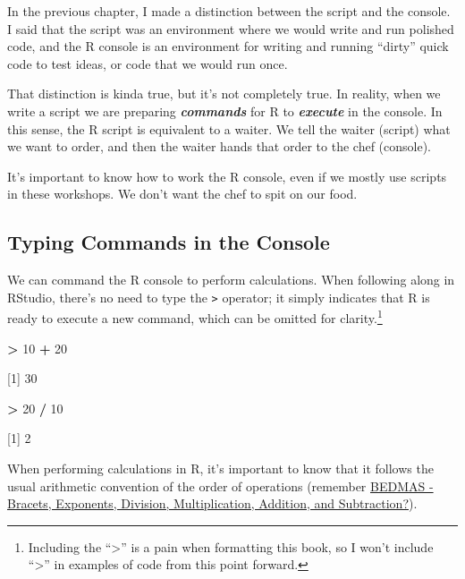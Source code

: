 \documentclass[
]{book}
\newenvironment{Shaded}{\begin{snugshade}}{\end{snugshade}}
\newcommand{\DecValTok}[1]{\textcolor[rgb]{0.00,0.00,0.81}{#1}}
\newcommand{\NormalTok}[1]{#1}
\newcommand{\SpecialCharTok}[1]{\textcolor[rgb]{0.81,0.36,0.00}{\textbf{#1}}}
\begin{document}
In the previous chapter, I made a distinction between the script and the console. I said that the script was an environment where we would write and run polished code, and the R console is an environment for writing and running ``dirty'' quick code to test ideas, or code that we would run once.

That distinction is kinda true, but it's not completely true. In reality, when we write a script we are preparing \textbf{\emph{commands}} for R to \textbf{\emph{execute}} in the console. In this sense, the R script is equivalent to a waiter. We tell the waiter (script) what we want to order, and then the waiter hands that order to the chef (console).

It's important to know how to work the R console, even if we mostly use scripts in these workshops. We don't want the chef to spit on our food.

\hypertarget{typing-commands-in-the-console}{%
\subsection{Typing Commands in the Console}\label{typing-commands-in-the-console}}

We can command the R console to perform calculations. When following along in RStudio, there's no need to type the \texttt{\textgreater{}} operator; it simply indicates that R is ready to execute a new command, which can be omitted for clarity.\footnote{Including the ``\textgreater{}'' is a pain when formatting this book, so I won't include ``\textgreater{}'' in examples of code from this point forward.}

\begin{Shaded}
\begin{Highlighting}[]
\SpecialCharTok{\textgreater{}} \DecValTok{10} \SpecialCharTok{+} \DecValTok{20}

\NormalTok{[}\DecValTok{1}\NormalTok{] }\DecValTok{30}
\end{Highlighting}
\end{Shaded}

\begin{Shaded}
\begin{Highlighting}[]
\SpecialCharTok{\textgreater{}} \DecValTok{20} \SpecialCharTok{/} \DecValTok{10}

\NormalTok{[}\DecValTok{1}\NormalTok{] }\DecValTok{2}
\end{Highlighting}
\end{Shaded}

When performing calculations in R, it's important to know that it follows the usual arithmetic convention of the order of operations (remember \href{https://www.tes.com/en-ie/teaching-resource/bidmas-bodmas-bedmas-bimdas-pemdas-permdas-11154272\#:~:text=\%E2\%80\%A2\%20BIMDAS\%20\%2D\%20Brackets\%2C\%20Indices\%2C,Multiplication\%2C\%20Division\%2C\%20Addition\%2C\%20Subtraction}{BEDMAS - Bracets, Exponents, Division, Multiplication, Addition, and Subtraction?}).
\end{document}
